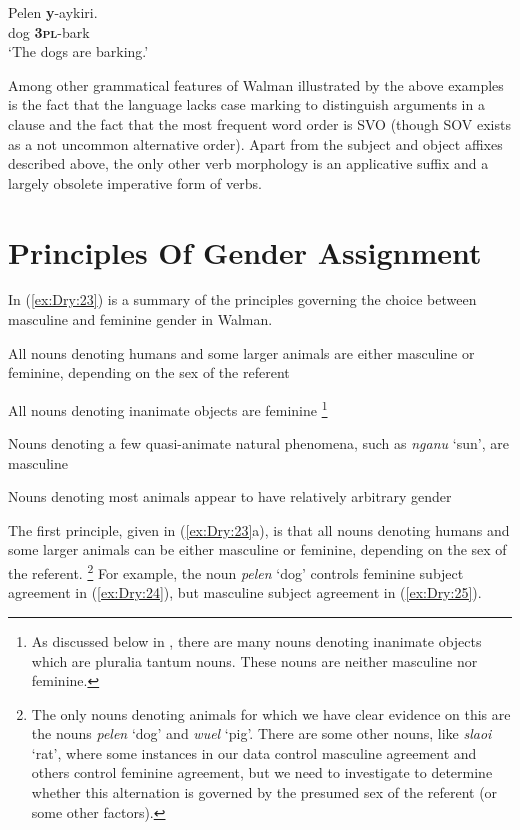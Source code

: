 \documentclass[output=collectionpaper]{langsci/langscibook}
\begin{document}
\ea \label{ex:Dry:22}
\gll Pelen	\textbf{y}-aykiri. \\
dog \textbf{\textsc{3pl}}-bark\\
\glt  `The dogs are barking.'
\z

Among other grammatical features of Walman illustrated by the above examples is the fact that the language lacks case marking to distinguish arguments in a clause and the fact that the most frequent word order is SVO (though SOV exists as a not uncommon alternative order). Apart from the subject and object affixes described above, the only other verb morphology is an applicative suffix and a largely obsolete imperative form of verbs.

\section{Principles Of Gender Assignment}
\label{sec:Dry:3}

In (\ref{ex:Dry:23}) is a summary of the principles governing the choice between masculine and feminine gender in Walman.

\ea%
    \label{ex:Dry:23}
\begin{xlist}
\ex  All nouns denoting humans and some larger animals are either masculine or feminine, depending on the sex of the referent

\ex  All nouns denoting inanimate objects are feminine%
\footnote{As discussed below in , there are many nouns denoting inanimate objects which are pluralia tantum nouns. These nouns are neither masculine nor feminine.}

\ex  Nouns denoting a few quasi-animate natural phenomena, such as \textit{nganu} `sun', are masculine

\ex  Nouns denoting most animals appear to have relatively arbitrary gender
\end{xlist}
\z

The first principle, given in (\ref{ex:Dry:23}a), is that all nouns denoting humans and some larger animals can be either masculine or feminine, depending on the sex of the referent.%
\footnote{The only nouns denoting animals for which we have clear evidence on this are the nouns \textit{pelen} `dog' and \textit{wuel} `pig'. There are some other nouns, like \textit{slaoi} `rat', where some instances in our data control masculine agreement and others control feminine agreement, but we need to investigate to determine whether this alternation is governed by the presumed sex of the referent (or some other factors).} %
For example, the noun \textit{pelen} `dog' controls feminine subject agreement in (\ref{ex:Dry:24}), but masculine subject agreement in (\ref{ex:Dry:25}).
\end{document}
